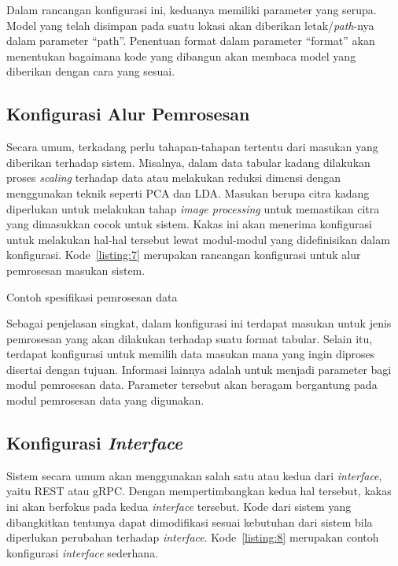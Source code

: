 Dalam rancangan konfigurasi ini, keduanya memiliki parameter yang serupa.
Model yang telah disimpan pada suatu lokasi akan diberikan letak/\textit{path}-nya dalam parameter ``path''.
Penentuan format dalam parameter ``format'' akan menentukan bagaimana kode yang dibangun akan membaca model yang diberikan dengan cara yang sesuai.

\subsection{Konfigurasi Alur Pemrosesan}\label{section:03-processing-pipeline}

Secara umum, terkadang perlu tahapan-tahapan tertentu dari masukan yang diberikan terhadap sistem.
Misalnya, dalam data tabular kadang dilakukan proses \textit{scaling} terhadap data atau melakukan reduksi dimensi dengan menggunakan teknik seperti PCA dan LDA.\@
Masukan berupa citra kadang diperlukan untuk melakukan tahap \textit{image processing} untuk memastikan citra yang dimasukkan cocok untuk sistem.
Kakas ini akan menerima konfigurasi untuk melakukan hal-hal tersebut lewat modul-modul yang didefinisikan dalam konfigurasi.
Kode~\ref{listing:7} merupakan rancangan konfigurasi untuk alur pemrosesan masukan sistem.

\begin{code}
	\caption{Contoh spesifikasi pemrosesan data}\label{listing:7}
\end{code}

Sebagai penjelasan singkat, dalam konfigurasi ini terdapat masukan untuk jenis pemrosesan yang akan dilakukan terhadap suatu format tabular.
Selain itu, terdapat konfigurasi untuk memilih data masukan mana yang ingin diproses disertai dengan tujuan.
Informasi lainnya adalah untuk menjadi parameter bagi modul pemrosesan data.
Parameter tersebut akan beragam bergantung pada modul pemrosesan data yang digunakan.

\subsection{Konfigurasi \textit{Interface}}\label{section:03-interface-config}
Sistem secara umum akan menggunakan salah satu atau kedua dari \textit{interface}, yaitu REST atau gRPC.\@
Dengan mempertimbangkan kedua hal tersebut, kakas ini akan berfokus pada kedua \textit{interface} tersebut.
Kode dari sistem yang dibangkitkan tentunya dapat dimodifikasi sesuai kebutuhan dari sistem bila diperlukan perubahan terhadap \textit{interface}.
Kode~\ref{listing:8} merupakan contoh konfigurasi \textit{interface} sederhana.

